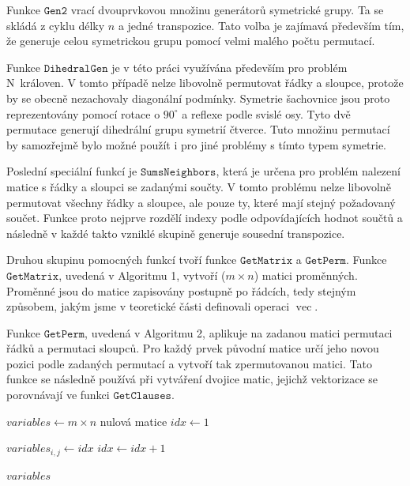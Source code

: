 Funkce $\texttt{Gen2}$ vrací dvouprvkovou množinu generátorů symetrické grupy. Ta se skládá z cyklu délky $n$ a jedné transpozice. Tato volba je zajímavá především tím, že generuje celou symetrickou grupu pomocí velmi malého počtu permutací.

Funkce $\texttt{DihedralGen}$ je v této práci využívána především pro problém N královen. V tomto případě nelze libovolně permutovat řádky a sloupce, protože by se obecně nezachovaly diagonální podmínky. Symetrie šachovnice jsou proto reprezentovány pomocí rotace o $90^\circ$ a reflexe podle svislé osy. Tyto dvě permutace generují dihedrální grupu symetrií čtverce. Tuto množinu permutací by samozřejmě bylo možné použít i pro jiné problémy s tímto typem symetrie.

Poslední speciální funkcí je $\texttt{SumsNeighbors}$, která je určena pro problém nalezení matice s řádky a sloupci se zadanými součty. V tomto problému nelze libovolně permutovat všechny řádky a sloupce, ale pouze ty, které mají stejný požadovaný součet. Funkce proto nejprve rozdělí indexy podle odpovídajících hodnot součtů a následně v každé takto vzniklé skupině generuje sousední transpozice.

Druhou skupinu pomocných funkcí tvoří funkce $\texttt{GetMatrix}$ a $\texttt{GetPerm}$. Funkce $\texttt{GetMatrix}$, uvedená v Algoritmu 1, vytvoří ($m \times n$) matici proměnných. Proměnné jsou do matice zapisovány postupně po řádcích, tedy stejným způsobem, jakým jsme v teoretické části definovali operaci $\operatorname{vec}$.

Funkce $\texttt{GetPerm}$, uvedená v Algoritmu 2, aplikuje na zadanou matici permutaci řádků a permutaci sloupců. Pro každý prvek původní matice určí jeho novou pozici podle zadaných permutací a vytvoří tak zpermutovanou matici. Tato funkce se následně používá při vytváření dvojice matic, jejichž vektorizace se porovnávají ve funkci $\texttt{GetClauses}$.


\begin{algorithm}[H]
\begin{algorithmic}[1]
    	\State $variables \gets m\times n$ nulová matice
    	\State $idx \gets 1$
    
            		\State $variables_{i,j} \gets idx$
            		\State $idx \gets idx + 1$
        	\EndFor
    	\EndFor
    
    	\State \Return $variables$
\EndFunction
\end{algorithmic}
\caption{Vytvoření matice proměnných}
\end{algorithm}



